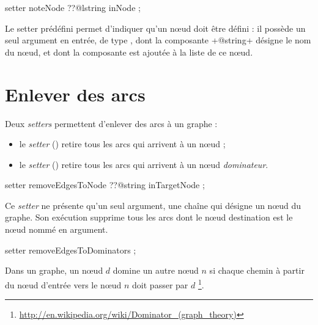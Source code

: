 
\begin{galgascode}
setter noteNode ??@lstring inNode ;
\end{galgascode}

Le setter prédéfini  permet d'indiquer qu'un nœud doit être défini : il possède un seul argument en entrée, de type , dont la composante \ggs+@string+ désigne le nom du nœud, et dont la composante  est ajoutée à la liste de ce nœud.



\section{Enlever des arcs}

Deux \emph{setters} permettent d'enlever des arcs à un graphe :
\begin{itemize}
  \item le \emph{setter}  () retire tous les arcs qui arrivent à un nœud ;
  \item le \emph{setter}  () retire tous les arcs qui arrivent à un nœud \emph{dominateur}.
\end{itemize}




\begin{galgascode}
setter removeEdgesToNode ??@string inTargetNode ;
\end{galgascode}

Ce \emph{setter} ne présente qu'un seul argument, une chaîne qui désigne un nœud du graphe. Son exécution supprime tous les arcs dont le nœud destination est le nœud nommé en argument.


\begin{galgascode}
setter removeEdgesToDominators ;
\end{galgascode}

Dans un graphe, un nœud $d$ domine un autre nœud $n$ si chaque chemin à partir du nœud d'entrée vers le nœud $n$ doit passer par $d$ \footnote{\url{http://en.wikipedia.org/wiki/Dominator_(graph_theory)}}.


